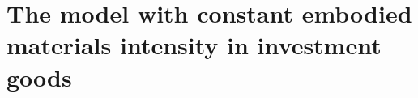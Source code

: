 \section{The model with constant embodied materials intensity in investment goods}\label{sec:app:constantPhiI}


